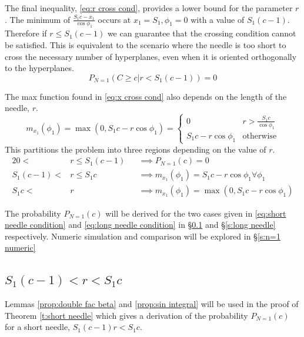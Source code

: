 \documentclass{article}
\begin{document}
The final inequality, \ref{eq:r cross cond}, provides a lower bound for the parameter $r$. The minimum of $\frac{S_1c - x_1}{\cos{\phi_1}}$
occurs at $x_1=S_1, \phi_1=0$ with a value of $S_1(c-1)$. Therefore if $r\le S_1(c-1)$ we can guarantee that the crossing condition
cannot be satisfied. This is equivalent to the scenario where the needle is too short to cross the necessary number of hyperplanes, even when it is oriented
orthogonally to the hyperplanes.
\begin{equation}
	P_{N=1}(C\ge c|r<S_1(c-1)) = 0
\end{equation}

The max function found in \ref{eq:x cross cond} also depends on the length of the needle, $r$. 
\begin{equation}
	m_{x_1}(\phi_1) = \max(0, S_1c-r\cos\phi_1) = \begin{cases}
		0 & r > \frac{S_1c}{\cos\phi_1} \\
		S_1c-r\cos\phi_1 & \text{otherwise}
	\end{cases}
\end{equation}
This partitions the problem into three regions depending on the value of $r$. 
\begin{alignat}{2}
	0 < &r \le S_1(c-1) &&\implies P_{N=1}(c) = 0 \\
	S_1(c-1) < &r \le S_1c &&\implies m_{x_1}(\phi_1) = S_1c-r\cos\phi_1 \forall \phi_1 \label{eq:short needle condition}\\
	S_1c < &r &&\implies m_{x_1}(\phi_1) = \max(0, S_1c -r\cos\phi_1) \label{eq:long needle condition}
\end{alignat}

The probability $P_{N=1}(c)$ will be derived for the two cases given in \ref{eq:short needle condition} and \ref{eq:long needle condition}
in \S \ref{s:short needle} and \S \ref{s:long needle} respectively. Numeric simulation and comparison will be explored in \S \ref{s:n=1 numeric}

\subsection{$S_1(c-1)<r<S_1c$} \label{s:short needle}
Lemmas \ref{prop:double fac beta} and \ref{prop:sin integral} will be used in the proof of Theorem \ref{t:short needle}
which gives a derivation of the probability $P_{N=1}(c)$ for a short needle, $S_1(c-1)r<S_1c$.
\end{document}
